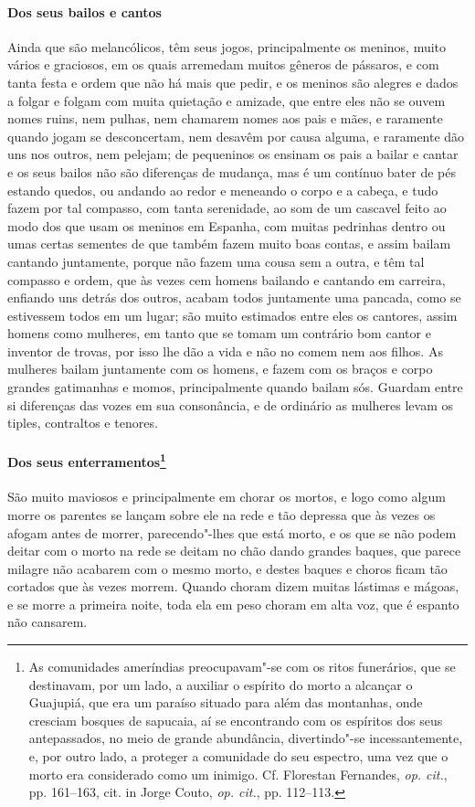 \begin{linenumbers}
\paragraph{Dos seus bailos e cantos} \quad
Ainda que são melancólicos, têm seus jogos, principalmente os
meninos, muito vários e graciosos, em os quais arremedam muitos gêneros
de pássaros, e com tanta festa e ordem que não há mais que pedir, e os
meninos são alegres e dados a folgar e folgam com muita quietação e
amizade, que entre eles não se ouvem nomes ruins, nem pulhas, nem
chamarem nomes aos pais e mães, e raramente quando jogam se
desconcertam, nem desavêm por causa alguma, e raramente dão uns nos
outros, nem pelejam; de pequeninos os ensinam os pais a bailar e cantar
e os seus bailos não são diferenças de mudança, mas é um contínuo bater
de pés estando quedos, ou andando ao redor e meneando o corpo e a
cabeça, e tudo fazem por tal compasso, com tanta serenidade, ao som de
um cascavel feito ao modo dos que usam os meninos em Espanha, com
muitas pedrinhas dentro ou umas certas sementes de que também fazem
muito boas contas, e assim bailam cantando juntamente, porque não fazem
uma cousa sem a outra, e têm tal compasso e ordem, que às vezes cem
homens bailando e cantando em carreira, enfiando uns detrás dos outros,
acabam todos juntamente uma pancada, como se estivessem todos em um
lugar; são muito estimados entre eles os cantores, assim homens como
mulheres, em tanto que se tomam um contrário bom cantor e inventor de
trovas, por isso lhe dão a vida e não no comem nem aos filhos. As
mulheres bailam juntamente com os homens, e fazem com os braços e corpo
grandes gatimanhas e momos, principalmente quando bailam sós. Guardam
entre si diferenças das vozes em sua consonância, e de ordinário as
mulheres levam os tiples, contraltos e tenores. 

\paragraph[Dos seus enterramentos]{Dos seus enterramentos\protect\footnote{ As comunidades ameríndias
preocupavam"-se com os ritos funerários, que se destinavam, por um lado,
a auxiliar o espírito do morto a alcançar o Guajupiá, que era um
paraíso situado para além das montanhas, onde cresciam bosques de
sapucaia, aí se encontrando com os espíritos dos seus antepassados, no
meio de grande abundância, divertindo"-se incessantemente, e, por outro
lado, a proteger a comunidade do seu espectro, uma vez que o morto era
considerado como um inimigo. Cf. Florestan Fernandes, \textit{op.
cit.}, pp. 161--163, cit. in Jorge Couto, \textit{op. cit.}, pp. 112--113.}} \quad
 São muito maviosos e principalmente em chorar os mortos, e logo como
algum morre os parentes se lançam sobre ele na rede e tão depressa que
às vezes os afogam antes de morrer, parecendo"-lhes que está morto, e os
que se não podem deitar com o morto na rede se deitam no chão dando
grandes baques, que parece milagre não acabarem com o mesmo morto, e
destes baques e choros ficam tão cortados que às vezes morrem. Quando
choram dizem muitas lástimas e mágoas, e se morre a primeira noite,
toda ela em peso choram em alta voz, que é espanto não cansarem.


\end{linenumbers}
